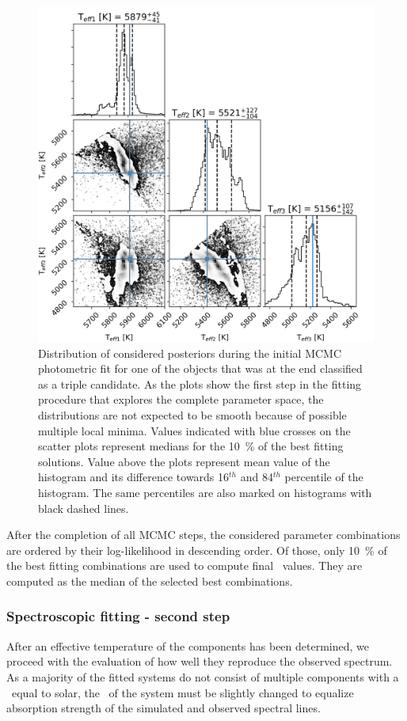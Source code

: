 \begin{figure}
	\centering
	\includegraphics[width=\textwidth]{150408004101169_p1884_corner_3star_00.png}
	\caption{Distribution of considered posteriors during the initial MCMC photometric fit for one of the objects that was at the end classified as a triple candidate. As the plots show the first step in the fitting procedure that explores the complete parameter space, the distributions are not expected to be smooth because of possible multiple local minima. Values indicated with blue crosses on the scatter plots represent medians for the 10~\% of the best fitting solutions. Value above the plots represent mean value of the histogram and its difference towards 16$^{th}$ and 84$^{th}$ percentile of the histogram. The same percentiles are also marked on histograms with black dashed lines.}
	\label{fig:posterior_dist}
\end{figure}

After the completion of all MCMC steps, the considered parameter combinations are ordered by their log-likelihood in descending order. Of those, only 10~\% of the best fitting combinations are used to compute final \Teffn{[1-3]}\ values. They are computed as the median of the selected best combinations. 

\subsubsection{Spectroscopic fitting - second step}
\label{sec:spectrum_fit}
After an effective temperature of the components has been determined, we proceed with the evaluation of how well they reproduce the observed spectrum. As a majority of the fitted systems do not consist of multiple components with a \Teff\ equal to solar, the \Feh\ of the system must be slightly changed to equalize absorption strength of the simulated and observed spectral lines.

